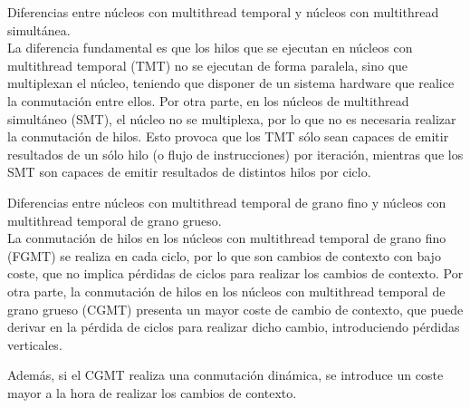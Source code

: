 \begin{cuestion}
    Diferencias entre núcleos con multithread temporal y núcleos con multithread simultánea.\\

    La diferencia fundamental es que los hilos que se ejecutan en núcleos con multithread temporal (TMT) no se ejecutan de forma paralela, sino que multiplexan el núcleo, teniendo que disponer de un sistema hardware que realice la conmutación entre ellos. Por otra parte, en los núcleos de multithread simultáneo (SMT), el núcleo no se multiplexa, por lo que no es necesaria realizar la conmutación de hilos. Esto provoca que los TMT sólo sean capaces de emitir resultados de un sólo hilo (o flujo de instrucciones) por iteración, mientras que los SMT son capaces de emitir resultados de distintos hilos por ciclo.
\end{cuestion}

\begin{cuestion}
    Diferencias entre núcleos con multithread temporal de grano fino y núcleos con multithread temporal de grano grueso.\\

    La conmutación de hilos en los núcleos con multithread temporal de grano fino (FGMT) se realiza en cada ciclo, por lo que son cambios de contexto con bajo coste, que no implica pérdidas de ciclos para realizar los cambios de contexto. Por otra parte, la conmutación de hilos en los núcleos con multithread temporal de grano grueso (CGMT) presenta un mayor coste de cambio de contexto, que puede derivar en la pérdida de ciclos para realizar dicho cambio, introduciendo pérdidas verticales.
    
    Además, si el CGMT realiza una conmutación dinámica, se introduce un coste mayor a la hora de realizar los cambios de contexto.
\end{cuestion}

